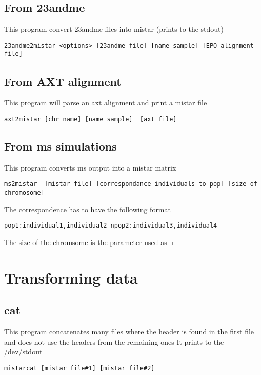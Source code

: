 \documentclass[a4paper]{article}
\begin{document}
\subsection{From 23andme}

This program convert 23andme files into mistar (prints to the stdout)

\begin{verbatim}
23andme2mistar <options> [23andme file] [name sample] [EPO alignment file]
\end{verbatim}

\subsection{From AXT alignment}

This program will parse an axt alignment and print a mistar file

\begin{verbatim}
axt2mistar [chr name] [name sample]  [axt file]
\end{verbatim}


\subsection{From ms simulations}
This program converts ms output into a mistar matrix

\small
\begin{verbatim}
ms2mistar  [mistar file] [correspondance individuals to pop] [size of chromosome]
\end{verbatim}
\normalsize

The correspondence has to have the following format
\begin{verbatim}
pop1:individual1,individual2-npop2:individual3,individual4
\end{verbatim}
The size of the chromsome is the parameter used as -r

\section{Transforming data}
\subsection{cat }
This program concatenates many files where the header is found in the
first file and does not use the headers from the remaining ones
It prints to the /dev/stdout
\begin{verbatim}
mistarcat [mistar file#1] [mistar file#2]
\end{verbatim}
\end{document}
